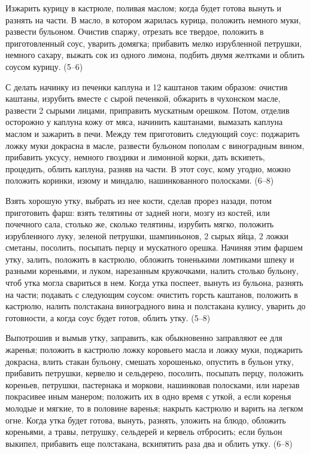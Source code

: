 
Изжарить курицу в кастрюле, поливая маслом; когда будет готова вынуть и разнять на части. В масло, в котором жарилась курица, положить немного муки, развести бульоном. Очистив спаржу, отрезать все твердое, положить в приготовленный соус, уварить домягка; прибавить мелко изрубленной петрушки, немного сахару, выжать сок из одного лимона, подбить двумя желтками и облить соусом курицу. (5--6) 


С делать начинку из печенки каплуна и 12 каштанов таким образом: очистив каштаны, изрубить вместе с сырой печенкой, обжарить в чухонском масле, развести 2 сырыми лицами, приправить мускатным орешком. Потом, отделив осторожно у каплуна кожу от мяса, начинить каштанами, вымазать каплуна маслом и зажарить в печи. Между тем приготовить следующий соус: поджарить ложку муки докрасна в масле, развести бульоном пополам с виноградным вином, прибавить уксусу, немного гвоздики и лимонной корки, дать вскипеть, процедить, облить каплуна, разняв на части. В этот соус, кому угодно, можно положить коринки, изюму и миндалю, нашинкованного полосками. (6--8)


Взять хорошую утку, выбрать из нее кости, сделав прорез назади, потом приготовить фарш: взять телятины от задней ноги, мозгу из костей, или почечного сала, столько же, сколько телятины, изрубить мягко, положить изрубленного луку, зеленой петрушки, шампиньонов, 2 сырых яйца, 2 ложки сметаны, посолить, посыпать перцу и мускатного орешка. Начиняя этим фаршем утку, залить, положить в кастрюлю, обложить тоненькими ломтиками шпеку и разными кореньями, и луком, нарезанным кружочками, налить столько бульону, чтоб утка могла свариться в нем. Когда утка поспеет, вынуть из бульона, разнять на части; подавать с следующим соусом: очистить горсть каштанов, положить в кастрюлю, налить полстакана виноградного вина и полстакана кулису, уварить до готовности, а когда соус будет готов, облить утку. (5--8) 


Выпотрошив и вымыв утку, заправить, как обыкновенно заправляют ее для жаренья; положить в кастрюлю ложку коровьего масла и ложку муки, поджарить докрасна, влить стакан бульону, смешать хорошенько, опустить в бульон утку, прибавить петрушки, кервелю и сельдерею, посолить, посыпать перцу, положить кореньев, петрушки, пастернака и моркови, нашинковав полосками, или нарезав покрасивее иным манером; положить их в одно время с уткой, а если коренья молодые и мягкие, то в половине варенья; накрыть кастрюлю и варить на легком огне. Когда утка будет готова, вынуть, разнять, уложить на блюдо, обложить кореньями, а травы, петрушку, сельдерей и кервель отбросить; если бульон выкипел, прибавить еще полстакана, вскипятить раза два и облить утку. (6--8) 

